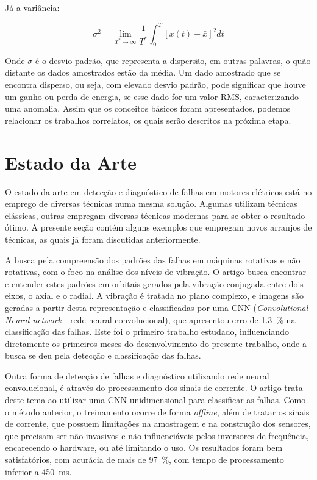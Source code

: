 Já a variância:

\begin{equation}\label{eq:variancia}
    \sigma^2 = \lim_{T^{*}\rightarrow\infty}{\frac{1}{T^*}} \int_{0}^{T}{[x(t)-\bar{x}]^2dt}
\end{equation}

Onde $\sigma$ é o desvio padrão, que representa a dispersão, em outras palavras, o quão distante os dados amostrados estão da média. Um dado
amostrado que se encontra disperso, ou seja, com elevado desvio padrão, pode significar que houve um ganho ou perda de energia, se esse dado
for um valor RMS, caracterizando uma anomalia. Assim que os conceitos básicos foram apresentados, podemos relacionar os trabalhos correlatos,
os quais serão descritos na próxima etapa.


% 

\section{Estado da Arte}

O estado da arte em detecção e diagnóstico de falhas em motores elétricos está no emprego de diversas técnicas numa mesma solução. Algumas 
utilizam técnicas clássicas, outras empregam diversas técnicas modernas para se obter o resultado ótimo. A presente seção contém
alguns exemplos que empregam novos arranjos de técnicas, as quais já foram discutidas anteriormente. 

A busca pela compreensão dos padrões das falhas em máquinas rotativas e não rotativas, com o foco na análise dos níveis de vibração. O artigo
\cite{Jeong2016} busca encontrar e entender estes padrões em orbitais gerados pela vibração conjugada entre dois eixos, o axial e o radial. A
vibração é tratada no plano complexo, e imagens são geradas a partir desta representação e classificadas por uma 
CNN (\textit{Convolutional Neural network} - rede neural convolucional), que apresentou erro de \SI{1.3}{\percent} na classificação das falhas.
Este foi o primeiro trabalho estudado, influenciando  diretamente os primeiros meses do desenvolvimento do presente trabalho, onde a busca se
deu pela detecção e classificação das falhas.

Outra forma de detecção de falhas e diagnóstico utilizando rede neural convolucional, é através do processamento dos sinais de corrente. O 
artigo \cite{Ince2016} trata deste tema ao utilizar uma CNN unidimensional para classificar as falhas. Como o método anterior, o treinamento
ocorre de forma \textit{offline}, além de tratar os sinais de corrente, que possuem limitações na amostragem e na construção dos sensores, que
precisam ser não invasivos e não influenciáveis pelos inversores de frequência, encarecendo o hardware, ou até limitando o uso. Os
resultados foram bem satisfatórios, com acurácia de mais de \SI{97}{\percent}, com tempo de processamento inferior a \SI{450}{\milli\second}.

